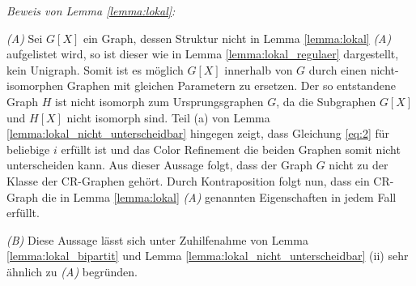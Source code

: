 \emph{Beweis von Lemma \ref{lemma:lokal}:}

\emph{(A)} Sei $G[X]$ ein Graph, dessen Struktur nicht in Lemma \ref{lemma:lokal} \emph{(A)} aufgelistet wird, so ist dieser wie in Lemma \ref{lemma:lokal_regulaer} dargestellt, kein Unigraph. Somit ist es möglich $G[X]$ innerhalb von $G$ durch einen nicht-isomorphen Graphen mit gleichen Parametern zu ersetzen. Der so entstandene Graph $H$ ist nicht isomorph zum Ursprungsgraphen $G$, da die Subgraphen $G[X]$ und $H[X]$ nicht isomorph sind. Teil (a) von Lemma \ref{lemma:lokal_nicht_unterscheidbar} hingegen zeigt, dass Gleichung \ref{eq:2} für beliebige $i$ erfüllt ist und das Color Refinement die beiden Graphen somit nicht unterscheiden kann. Aus dieser Aussage folgt, dass der Graph $G$ nicht zu der Klasse der CR-Graphen gehört. Durch Kontraposition folgt nun, dass ein CR-Graph die in Lemma \ref{lemma:lokal} \emph{(A)} genannten Eigenschaften in jedem Fall erfüllt.

\emph{(B)} Diese Aussage lässt sich unter Zuhilfenahme von Lemma \ref{lemma:lokal_bipartit} und Lemma \ref{lemma:lokal_nicht_unterscheidbar} (ii) sehr ähnlich zu \emph{(A)} begründen.
